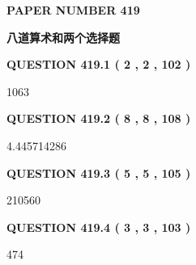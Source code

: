 \documentclass{ctexart}
\begin{document}
   
   
   
 {\textbf{ \Large{ PAPER NUMBER  419  }}}
   
   
\vspace{0.2in}
   
   
   
   
   
   
 \vspace{0.2in}
{\LARGE {\textbf{ 八道算术和两个选择题}}}
   
   
  
\vspace{0.2in}
  
{\textbf{\Large{QUESTION
419.1 
 ( 2 , 2 , 102 )
}}}
  
  
 
 
\noindent{}

1063
 
 
  
\vspace{0.2in}
  
{\textbf{\Large{QUESTION
419.2 
 ( 8 , 8 , 108 )
}}}
  
  
 
 
\noindent{}

4.445714286
 
 
  
\vspace{0.2in}
  
{\textbf{\Large{QUESTION
419.3 
 ( 5 , 5 , 105 )
}}}
  
  
 
 
\noindent{}

210560
 
 
  
\vspace{0.2in}
  
{\textbf{\Large{QUESTION
419.4 
 ( 3 , 3 , 103 )
}}}
  
  
 
 
\noindent{}

474
 
 
  
\vspace{0.2in}
  
\end{document}
